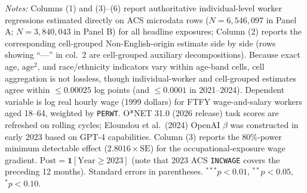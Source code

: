 \begin{table}[htbp]
{\begin{tabular}{lcccccc}
\bottomrule
\end{tabular}%
}
\vspace{4pt}
\begin{minipage}{\textwidth}\scriptsize
\textit{Notes:} Columns (1) and (3)--(6) report authoritative individual-level worker regressions estimated directly on ACS microdata rows ($N = 6{,}546{,}097$ in Panel A; $N = 3{,}840{,}043$ in Panel B) for all headline exposures; Column (2) reports the corresponding cell-grouped Non-English-origin estimate side by side (rows showing ``---'' in col.\ 2 are cell-grouped auxiliary decompositions). Because exact age, $\text{age}^2$, and race/ethnicity indicators vary within age-band cells, cell aggregation is not lossless, though individual-worker and cell-grouped estimates agree within $\le 0.00025$ log points (and $\le 0.0001$ in 2021--2024). Dependent variable is log real hourly wage (1999 dollars) for FTFY wage-and-salary workers aged 18--64, weighted by \texttt{PERWT}. O*NET 31.0 (2026 release) task scores are refreshed on rolling cycles; Eloundou et al.\ (2024) OpenAI $\beta$ was constructed in early 2023 based on GPT-4 capabilities. Column (3) reports the 80\%-power minimum detectable effect ($2.8016 \times \text{SE}$) for the occupational-exposure wage gradient. $\text{Post} = \mathbf{1}[\text{Year} \ge 2023]$ (note that 2023 ACS \texttt{INCWAGE} covers the preceding 12 months). Standard errors in parentheses. $^{***}p<0.01$, $^{**}p<0.05$, $^{*}p<0.10$.
\end{minipage}
\end{table}
